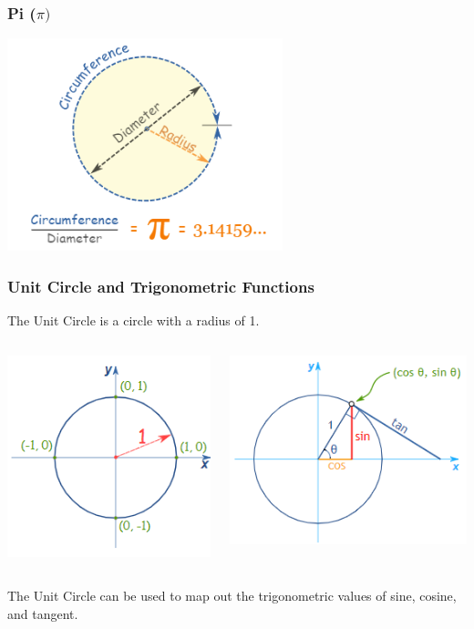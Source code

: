 \documentclass{beamer}
\begin{document}
\begin{frame}\frametitle{Pi ($\pi)$}

\begin{center}
\includegraphics[width=8cm]{fig/pi.png}
\end{center}

\end{frame}


\begin{frame}\frametitle{Unit Circle and Trigonometric Functions}
The Unit Circle is a circle with a radius of 1.
\begin{columns}
\begin{column}{6cm}
\begin{center}
\includegraphics[scale=0.75]{fig/unitcircle.png}
\end{center}
\end{column}
\begin{column}{6cm}
\begin{center}
\includegraphics[scale=0.75]{fig/unitcircle_cst.png}
\end{center}
\end{column}
\end{columns}
The Unit Circle can be used to map out the trigonometric values of sine, cosine, and tangent.
\end{frame}
\end{document}
